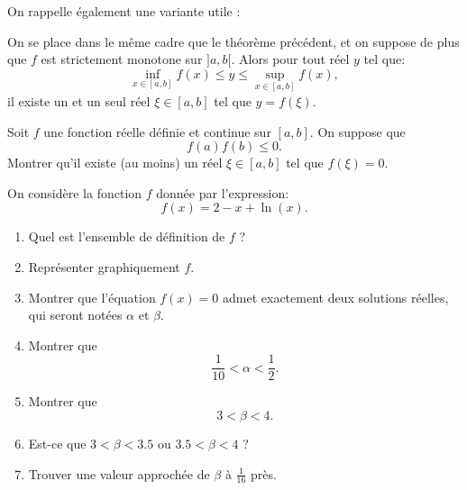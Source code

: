On rappelle également une variante utile :

\begin{theorem}
On se place dans le même cadre que le théorème précédent, et on suppose de plus que $f$ est strictement monotone sur $]a,b[$. Alors pour tout réel $y$ tel que:
\[
\inf_{x \in [a,b]} f(x) \leq y \leq \sup_{x \in [a,b]} f(x),
\]
il existe un et un seul réel $\xi \in [a,b]$ tel que $y = f(\xi)$.
\end{theorem}

\begin{exercice}

Soit $f$ une fonction réelle définie et continue sur $[a,b]$. On suppose que 
\[
f(a) f(b) \leq 0.
\]
Montrer qu'il existe (au moins) un réel $\xi \in [a,b]$ tel que $f(\xi)=0$.
\end{exercice}

\medskip

\begin{exercice}

On considère la fonction $f$ donnée par l'expression:
\[
f(x) = 2 - x + \ln(x).
\]

\begin{enumerate}

\item Quel est l'ensemble de définition de $f$ ?

\item Représenter graphiquement $f$.

\item Montrer que l'équation $f(x)=0$ admet exactement deux solutions réelles, qui seront notées $\alpha$ et $\beta$.

\item Montrer que
\[
\frac1{10} < \alpha < \frac12.
\]

\item Montrer que
\[
3 < \beta < 4.
\]

\item Est-ce que $3 < \beta < 3.5$ ou $3.5 < \beta < 4$ ?

\item Trouver une valeur approchée de $\beta$ à $\frac1{16}$ près.

\end{enumerate}

\end{exercice}

\medskip

